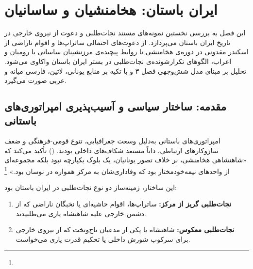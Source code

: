 \chapter{ایران باستان: هخامنشیان و ساسانیان}
\label{ch:ancient-iran}

\begin{tcolorbox}[mybox, title={چکیده‌ی فصل}]
این فصل به بررسی نخستین نمونه‌های مستند نجات‌طلبی و دعوت از نیروی خارجی در تاریخ ایران باستان می‌پردازد. از دعوت‌های احتمالی ساتراپ‌ها و اقوام ناراضی از اسکندر مقدونی در دوره‌ی هخامنشی تا روابط پیچیده‌ی مرزنشینان ساسانی با رومیان و اعراب، الگوهای تکرارشونده‌ی نجات‌طلبی در بستر ایران باستان واکاوی می‌شود. تحلیل بر مبنای مدل شش‌وجهی فصل ۳ و با تکیه بر منابع یونانی، لاتین، فارسی میانه و عربی صورت می‌گیرد.
\end{tcolorbox}

\section{مقدمه: ساختار سیاسی و آسیب‌پذیری امپراتوری‌های باستانی}
\label{sec:ch04-intro}

امپراتوری‌های باستانی به‌دلیل وسعت جغرافیایی، تنوع قومی-فرهنگی و ضعف سازوکارهای ارتباطی، ذاتاً مستعد شکاف‌های داخلی بودند.  () تأکید می‌کند که «شاهنشاهی هخامنشی، بر خلاف تصور یونانیان، یک بلوک یکپارچه نبود بلکه مجموعه‌ای از واحدهای نیمه‌خودمختار بود که وفاداری‌شان به مرکز همواره در نوسان بود.»%
\footnote{}

این ساختار، زمینه‌ساز دو نوع نجات‌طلبی در ایران باستان بود:
\begin{enumerate}[nosep, label=\textbf{\arabic*.}]
  \item \textbf{نجات‌طلبی گریز از مرکز:} ساتراپ‌ها، اقوام حاشیه‌ای یا نخبگان ناراضی که از دشمن خارجی علیه شاهنشاه یاری می‌طلبیدند.
  \item \textbf{نجات‌طلبی معکوس:} شاهنشاه یا یکی از مدعیان تاج‌وتخت که از نیروی خارجی برای سرکوب شورش داخلی یا تحکیم قدرت یاری می‌خواست.
\end{enumerate}

